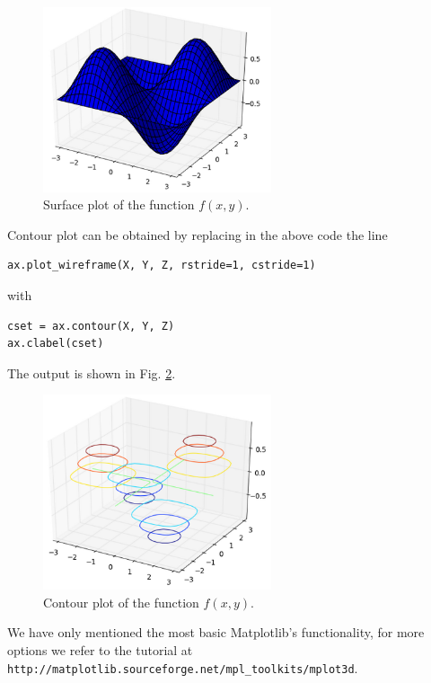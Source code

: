 \begin{figure}[!ht]
\begin{center}
\includegraphics[width=0.6\textwidth]{imgp/plot3d-3.png}
\end{center}
\vspace{-4mm}
\caption{Surface plot of the function $f(x, y)$.}
\label{fig:plot3d-3}
\end{figure}
\newpage

\noindent
Contour plot can be obtained by replacing in the above code 
the line 

\begin{verbatim}
ax.plot_wireframe(X, Y, Z, rstride=1, cstride=1)
\end{verbatim}
with 

\begin{verbatim}
cset = ax.contour(X, Y, Z)
ax.clabel(cset)
\end{verbatim}
The output is shown in Fig. \ref{fig:plot3d-4}.

\begin{figure}[!ht]
\begin{center}
\includegraphics[width=0.6\textwidth]{imgp/plot3d-4.png}
\end{center}
\vspace{-4mm}
\caption{Contour plot of the function $f(x, y)$.}
\label{fig:plot3d-4}
\end{figure}
\noindent
We have only mentioned the most basic Matplotlib's functionality, for more options 
we refer to the tutorial 
at {\tt http://matplotlib.sourceforge.net/mpl\_toolkits/mplot3d}.


